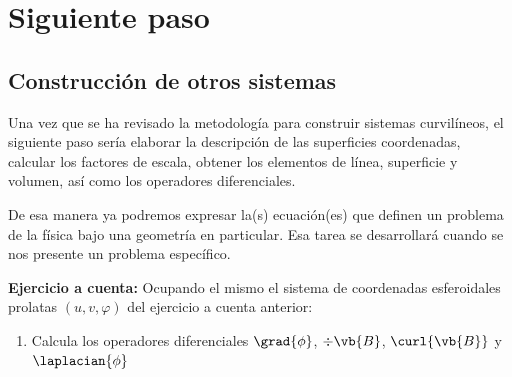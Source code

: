 \section{Siguiente paso}
\subsection{Construcción de otros sistemas}
Una vez que se ha revisado la metodología para construir sistemas curvilíneos, el siguiente paso sería elaborar la descripción de las superficies coordenadas, calcular los factores de escala, obtener los elementos de línea, superficie y volumen, así como los operadores diferenciales.
\par
De esa manera ya podremos expresar la(s) ecuación(es) que definen un problema de la física bajo una geometría en particular. Esa tarea se desarrollará cuando se nos presente un problema específico.
\par
\textbf{Ejercicio a cuenta: } Ocupando el mismo el sistema de coordenadas esferoidales prolatas $(u, v, \varphi)$ del ejercicio a cuenta anterior:
\begin{enumerate}
\item Calcula los operadores diferenciales $\grad{\phi}$, $\div{\vb{B}}$, $\curl{\vb{B}}$ y $\laplacian{\phi}$
\end{enumerate}
